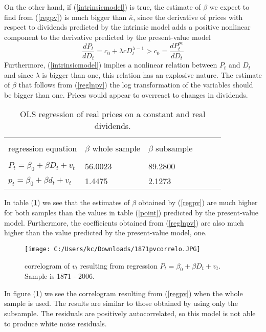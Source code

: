 \documentclass{article}
\begin{document}
On the other hand, if (\ref{intrinsicmodel}) is true, the estimate of $\beta$ we expect to find from (\ref{regpv})  is much bigger than $\overline{\kappa}$, since the derivative of prices with respect to dividends predicted by the intrinsic model adds a positive nonlinear component to the derivative predicted by the present-value model
$$\frac{d P_t}{d D_t} = c_0 + \lambda c D_t^{\lambda - 1} >  c_0 = \frac{d P_t^{pv}}{d D_t}$$ 
Furthermore, (\ref{intrinsicmodel}) implies a nonlinear relation between $P_t$ and $D_t$ and since $\lambda$ is bigger than one, this relation has an explosive nature. The estimate of $\beta$ that follows from (\ref{reglnpv}) the log transformation of the variables should be bigger than one. Prices would appear to overreact to changes in dividends. 
\
\begin{table}[h!]
\centering
\begin{tabular}{l | l | l l l l }
\hline \\
regression equation & $\beta$ whole sample & $\beta$ subsample \\
\hline \\
 $P_t = \beta_0 + \beta D_t  + v_t$ &  56.0023 & 89.2800 \\
$p_t = \beta_0 + \beta d_t  + v_t$ & 1.4475 & 2.1273   \\ \hline 
\end{tabular}
\caption{OLS regression of real prices on a constant and real dividends.}
\label{sensitivity}
\end{table}

In table (\ref{sensitivity}) we see that the estimates of $\beta$ obtained by (\ref{regpv}) are much higher for both samples than the values in table (\ref{point}) predicted by the present-value model.  Furthermore, the coefficients obtained from (\ref{reglnpv}) are also much higher than the value predicted by the present-value model, one.

\begin{figure}
	\centering
		\texttt{[image: C:/Users/kc/Downloads/1871pvcorrelo.JPG]}
	\caption{correlogram of $v_t$ resulting from regression $P_t = \beta_0 + \beta D_t  + v_t$. Sample is 1871 - 2006. }
	\label{correlo}
\end{figure}

In figure (\ref{correlo}) we see the correlogram resulting from (\ref{regpv}) when the whole sample is used. The results are similar to those obtained by using only the subsample. The residuals are positively autocorrelated, so this model is not able to produce white noise residuals.  
\end{document}
